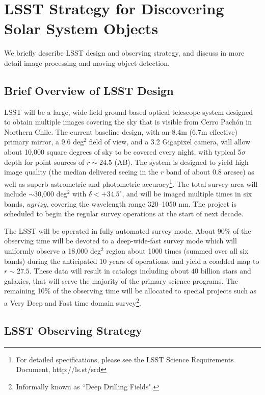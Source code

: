 
\section{LSST Strategy for Discovering Solar System Objects} 

We briefly describe LSST design and observing strategy, and discuss in more
detail image processing and moving object detection. 


\subsection{Brief Overview of LSST  Design} 

LSST will be a large, wide-field ground-based optical telescope system
designed to obtain multiple images covering the sky that is visible
from Cerro Pach\'{o}n in Northern Chile. The current baseline design,
with an 8.4m (6.7m effective) primary mirror, a 9.6 deg$^2$ field of
view, and a 3.2 Gigapixel camera, will allow about 10,000 square
degrees of sky to be covered every night, with typical 5$\sigma$ depth 
for point sources of $r\sim24.5$ (AB). The system is designed to yield 
high image quality (the median delivered seeing in the $r$ band of 
about 0.8 arcsec) as well as superb astrometric  and photometric 
accuracy\footnote{For detailed specifications, please see the LSST
Science Requirements Document, http://ls.st/srd}. The total survey
area will include $\sim$30,000 deg$^2$ with $\delta<+34.5^\circ$, and 
will be imaged multiple times in six bands, $ugrizy$, covering the 
wavelength range 320--1050 nm. The project is scheduled to  begin the 
regular survey operations at the start of next decade. 

The LSST will be operated in fully automated survey mode. About 90\% of the 
observing time will be devoted to a deep-wide-fast survey mode which will 
uniformly observe a 18,000 deg$^2$ region about 1000 times (summed over 
all six bands) during the anticipated 10 years of operations, and yield a coadded map 
to $r\sim27.5$. These data will result in catalogs including about
$40$ billion stars and galaxies, that will serve the majority of the
primary science programs. The remaining 10\% of the observing time
will be allocated to special projects such as a Very Deep and Fast
time domain survey\footnote{Informally known as ``Deep Drilling Fields".}.



\subsection{LSST Observing Strategy} 

